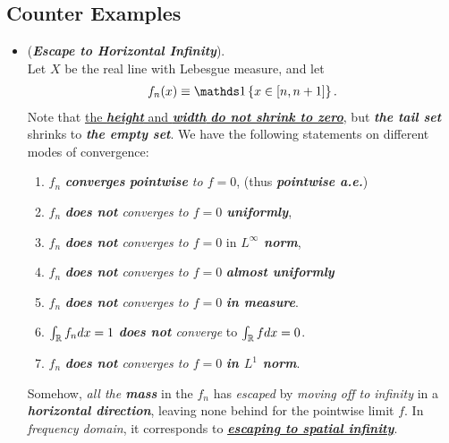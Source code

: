 \documentclass[11pt]{article}
\begin{document}
\subsection{Counter Examples}
\begin{itemize}
\item \begin{example} (\emph{\textbf{Escape to Horizontal Infinity}}).\\
 Let $X$ be the real line with Lebesgue measure, and let 
\begin{align*}
f_n(x) \equiv \ind{x \in [n,n+1]}.
\end{align*}  Note that \underline{the \emph{\textbf{height}} and \emph{\textbf{width}} \emph{\textbf{do not shrink to zero}}}, but \emph{\textbf{the tail set}} shrinks to \emph{\textbf{the empty set}}. We have the following statements on different modes of convergence:
\begin{enumerate}
\item  $f_n$ \emph{\textbf{converges} \textbf{pointwise} to $f = 0$}, (thus \textbf{\emph{pointwise a.e.}})
\item  $f_n$ \emph{\textbf{does not} converges  to $f = 0$ \textbf{uniformly}},
\item  $f_n$ \emph{\textbf{does not} converges to $f = 0$} in \emph{\textbf{$L^{\infty}$ norm}}, 
\item  $f_n$ \emph{\textbf{does not} converges to $f = 0$} \emph{\textbf{almost uniformly}} 
\item $f_n$ \emph{\textbf{does not} converges to $f = 0$} \emph{\textbf{in measure}}.
\item $\int_{{\mathbb R}}f_{n} dx = 1$ \emph{\textbf{does not} converge} to $\int_{{\mathbb R}}f dx = 0$.
\item  $f_n$ \emph{\textbf{does not} converges to $f = 0$} \emph{\textbf{in $L^1$ norm}}. 
\end{enumerate} Somehow, \emph{all the \textbf{mass}} in the $f_n$ has \emph{escaped} by \emph{moving off to infinity} in a \emph{\textbf{horizontal direction}}, leaving none behind for the pointwise limit $f$. In \emph{frequency domain}, it corresponds to \emph{\textbf{\underline{escaping to spatial infinity}}}.  
\end{example}


\end{itemize}
\end{document}
